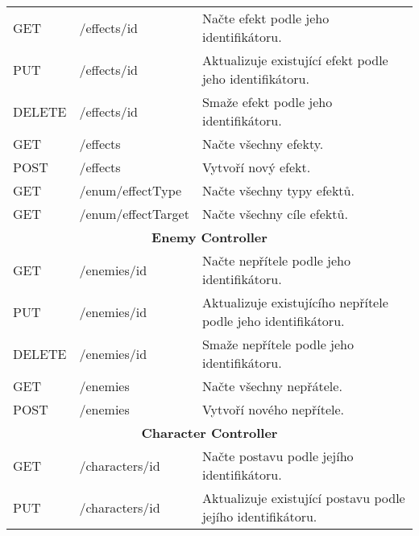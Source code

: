 \begin{longtable}{|l|l|p{}|}
    \hline
    GET             & /effects/{id}               & Načte efekt podle jeho identifikátoru.                              \\
    PUT             & /effects/{id}               & Aktualizuje existující efekt podle jeho identifikátoru.             \\
    DELETE          & /effects/{id}               & Smaže efekt podle jeho identifikátoru.                              \\
    GET             & /effects                    & Načte všechny efekty.                                               \\
    POST            & /effects                    & Vytvoří nový efekt.                                                 \\
    GET             & /enum/effectType            & Načte všechny typy efektů.                                          \\
    GET             & /enum/effectTarget          & Načte všechny cíle efektů.                                          \\
    \hline
    \multicolumn{3}{|c|}{\textbf{Enemy Controller}}                                                                     \\
    \hline
    GET             & /enemies/{id}               & Načte nepřítele podle jeho identifikátoru.                          \\
    PUT             & /enemies/{id}               & Aktualizuje existujícího nepřítele podle jeho identifikátoru.       \\
    DELETE          & /enemies/{id}               & Smaže nepřítele podle jeho identifikátoru.                          \\
    GET             & /enemies                    & Načte všechny nepřátele.                                            \\
    POST            & /enemies                    & Vytvoří nového nepřítele.                                           \\
    \hline
    \multicolumn{3}{|c|}{\textbf{Character Controller}}                                                                 \\
    \hline
    GET             & /characters/{id}            & Načte postavu podle jejího identifikátoru.                          \\
    PUT             & /characters/{id}            & Aktualizuje existující postavu podle jejího identifikátoru.         \\

\end{longtable}

